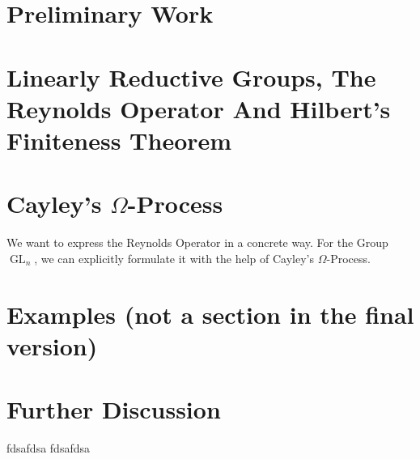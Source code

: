 \documentclass{article}
\theoremstyle{prrt}
\begin{document}
\section{Preliminary Work}\label{pw}

\bigskip



\section{Linearly Reductive Groups, The Reynolds Operator And Hilbert's Finiteness Theorem}



\section{Cayley's $\Omega$-Process}

We want to express the Reynolds Operator in a concrete way.
For the Group $\operatorname{GL}_n$, we can explicitly formulate it with the help of Cayley's $\Omega$-Process.



\section{Examples (not a section in the final version)}



\section{Further Discussion}
fdsafdsa
fdsafdsa

% 
%
% 


\end{document}
